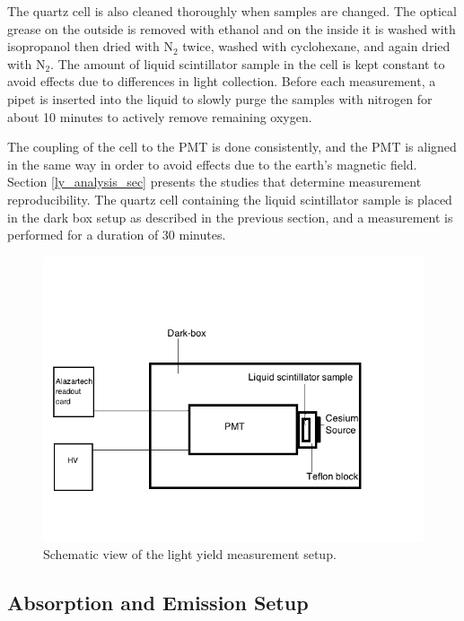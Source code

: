 \documentclass{JINST}
\begin{document}
The quartz cell is also cleaned thoroughly when samples are changed. The optical grease on the outside is removed with ethanol and on the inside it is washed with isopropanol then dried with N$_{2}$ twice, washed with cyclohexane, and again dried with N$_{2}$. The amount of liquid scintillator sample in the cell is kept constant to avoid effects due to differences in light collection. Before each measurement, a pipet is inserted into the liquid to slowly purge the samples with nitrogen for about 10 minutes to actively remove remaining oxygen. 

The coupling of the cell to the PMT is done consistently, and the PMT is aligned in the same way in order to avoid effects due to the earth's magnetic field. Section \ref{ly_analysis_sec} presents the studies that determine measurement reproducibility.  The quartz cell containing the liquid scintillator sample is placed in the dark box setup as described in the previous section, and a measurement is performed for a duration of 30 minutes.
 
\begin{figure}[tbh]
        \begin{center}
        \includegraphics[scale=0.6]{graphs/Diagram_Darkbox.png}
\caption[]{Schematic view of the light yield measurement setup. \label{setup_fig}}
\end{center}
\end{figure}

\subsection{Absorption and Emission Setup}
\end{document}
